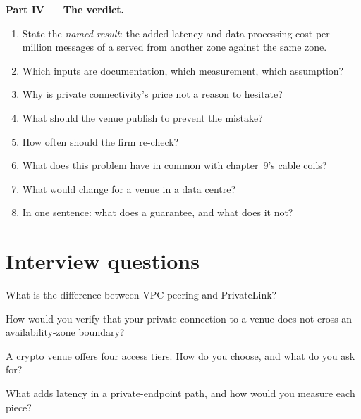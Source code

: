 \begin{problem}
\medskip\noindent\textbf{Part IV --- The verdict.}
\begin{enumerate}[resume]
\item State the \emph{named result}: the added latency and data-processing cost per million messages of a  served from another zone
  against the same zone.
\item Which inputs are documentation, which measurement, which assumption?
\item Why is private connectivity's price not a reason to hesitate?
\item What should the venue publish to prevent the mistake?
\item How often should the firm re-check?
\item What does this problem have in common with chapter~9's cable coils?
\item What would change for a venue in a data centre?
\item In one sentence: what does a  guarantee, and what does it not?
\end{enumerate}
\end{problem}

\section{Interview questions}

\begin{interviewq}\label{iq:nw:private-connectivity-to-crypto-venues:1}
What is the difference between VPC peering and PrivateLink?
\end{interviewq}

\begin{interviewq}\label{iq:nw:private-connectivity-to-crypto-venues:2}
How would you verify that your private connection to a venue does not cross an availability-zone boundary?
\end{interviewq}

\begin{interviewq}\label{iq:nw:private-connectivity-to-crypto-venues:3}
A crypto venue offers four access tiers. How do you choose, and what do you ask for?
\end{interviewq}

\begin{interviewq}\label{iq:nw:private-connectivity-to-crypto-venues:4}
What adds latency in a private-endpoint path, and how would you measure each piece?
\end{interviewq}

